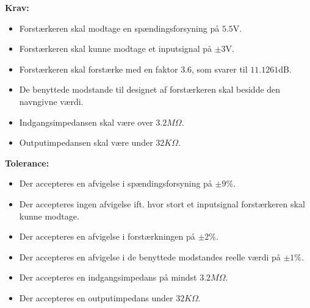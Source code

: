 \noindent\textbf{Krav:}
\begin{itemize}
	\item Forstærkeren skal modtage en spændingsforsyning på $5.5$V.
	\item Forstærkeren skal kunne modtage et inputsignal på $\pm3$V.
	\item Forstærkeren skal forstærke med en faktor $3.6$, som svarer til $11.1261$dB.
	\item De benyttede modstande til designet af forstærkeren skal besidde den navngivne værdi.
	\item Indgangsimpedansen skal være over $3.2M\Omega$.
	\item Outputimpedansen skal være under $32K\Omega$.
\end{itemize}
\noindent\textbf{Tolerance:}
\begin{itemize}
	\item Der accepteres en afvigelse i spændingsforsyning på $\pm9\%$.
	\item Der accepteres ingen afvigelse ift. hvor stort et inputsignal forstærkeren skal kunne modtage.
	\item Der accepteres en afvigelse i forstærkningen på $\pm2\%$.
	\item Der accepteres en afvigelse i de benyttede modstandes reelle værdi på $\pm1\%$.
	\item Der accepteres en indgangsimpedans på mindst $3.2M\Omega$.
	\item Der accepteres en outputimpedans under $32K\Omega$.
\end{itemize}

